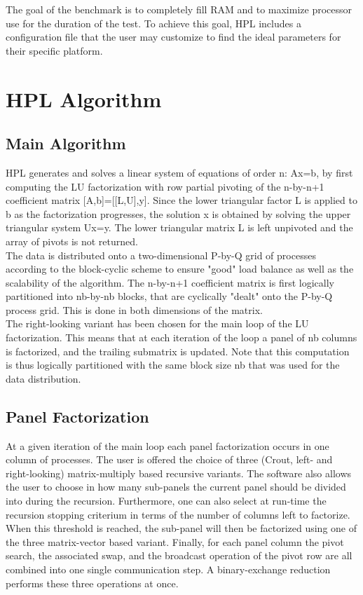 \documentclass[a4paper, 11pt]{article}
\begin{document}
The goal of the benchmark is to completely fill RAM and to maximize processor use for the duration of the test. To achieve this goal, HPL includes a configuration file that the user may customize to find the ideal parameters for their specific platform.

\section{HPL Algorithm}

\subsection{Main Algorithm}

HPL generates and solves a linear system of equations of order n: Ax=b, by first computing the LU factorization with row partial pivoting of the n-by-n+1 coefficient matrix [A,b]=[[L,U],y]. Since the lower triangular factor L is applied to b as the factorization progresses, the solution x is obtained by solving the upper triangular system Ux=y. The lower triangular matrix L is left unpivoted and the array of pivots is not returned.\cite{website:paper} \\

The data is distributed onto a two-dimensional P-by-Q grid of processes according to the block-cyclic scheme to ensure "good" load balance as well as the scalability of the algorithm. The n-by-n+1 coefficient matrix is first logically partitioned into nb-by-nb blocks, that are cyclically "dealt" onto the P-by-Q process grid. This is done in both dimensions of the matrix. \\

The right-looking variant has been chosen for the main loop of the LU factorization. This means that at each iteration of the loop a panel of nb columns is factorized, and the trailing submatrix is updated. Note that this computation is thus logically partitioned with the same block size nb that was used for the data distribution. \\

\subsection{Panel Factorization}

At a given iteration of the main loop each panel factorization occurs in one column of processes. The user is offered the choice of three (Crout, left- and right-looking) matrix-multiply based recursive variants. The software also allows the user to choose in how many sub-panels the current panel should be divided into during the recursion. Furthermore, one can also select at run-time the recursion stopping criterium in terms of the number of columns left to factorize. When this threshold is reached, the sub-panel will then be factorized using one of the three matrix-vector based variant. Finally, for each panel column the pivot search, the associated swap, and the broadcast operation of the pivot row are all combined into one single communication step. A binary-exchange reduction performs these three operations at once.
\end{document}
